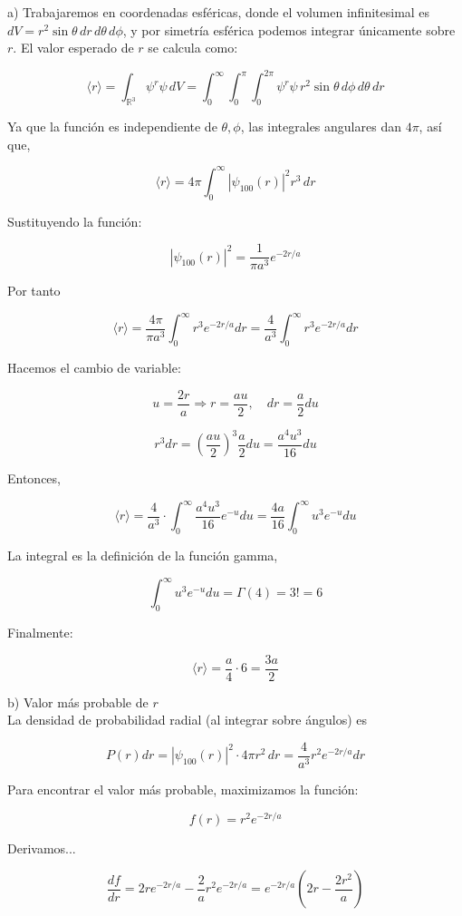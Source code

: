 \documentclass{article}
\theoremstyle{nonumberplain}
\begin{document}
a) Trabajaremos en coordenadas esféricas, donde el volumen infinitesimal es $dV = r^2 \sin\theta \, dr \, d\theta \, d\phi$, y por simetría esférica podemos integrar únicamente sobre $r$. El valor esperado de $r$ se calcula como:

$$
\langle r \rangle = \int_{\mathbb{R}^3} \psi^ r \psi \, dV = \int_0^\infty \int_0^\pi \int_0^{2\pi} \psi^ r \psi \, r^2 \sin\theta \, d\phi \, d\theta \, dr
$$

Ya que la función es independiente de $\theta, \phi$, las integrales angulares dan $4\pi$, así que,

$$
\langle r \rangle = 4\pi \int_0^\infty \left| \psi_{100}(r) \right|^2 r^3 \, dr
$$

Sustituyendo la función:

$$
|\psi_{100}(r)|^2 = \frac{1}{\pi a^3} e^{-2r/a}
$$

Por tanto

$$
\langle r \rangle = \frac{4\pi}{\pi a^3} \int_0^\infty r^3 e^{-2r/a} dr = \frac{4}{a^3} \int_0^\infty r^3 e^{-2r/a} dr
$$

Hacemos el cambio de variable:

$$
u = \frac{2r}{a} \Rightarrow r = \frac{a u}{2}, \quad dr = \frac{a}{2} du
$$

$$
r^3 dr = \left(\frac{a u}{2}\right)^3 \frac{a}{2} du = \frac{a^4 u^3}{16} du
$$

Entonces,

$$
\langle r \rangle = \frac{4}{a^3} \cdot \int_0^\infty \frac{a^4 u^3}{16} e^{-u} du = \frac{4 a}{16} \int_0^\infty u^3 e^{-u} du
$$

La integral es la definición de la función gamma,

$$
\int_0^\infty u^3 e^{-u} du = \Gamma(4) = 3! = 6
$$

Finalmente:

$$
\langle r \rangle = \frac{a}{4} \cdot 6 = \frac{3a}{2}
$$

b) Valor más probable de $r$ \\

La densidad de probabilidad radial (al integrar sobre ángulos) es

$$
P(r) dr = |\psi_{100}(r)|^2 \cdot 4\pi r^2 \, dr = \frac{4}{a^3} r^2 e^{-2r/a} dr
$$

Para encontrar el valor más probable, maximizamos la función:

$$
f(r) = r^2 e^{-2r/a}
$$

Derivamos...

$$
\frac{df}{dr} = 2r e^{-2r/a} - \frac{2}{a} r^2 e^{-2r/a} = e^{-2r/a} \left(2r - \frac{2r^2}{a} \right)
$$
\end{document}
